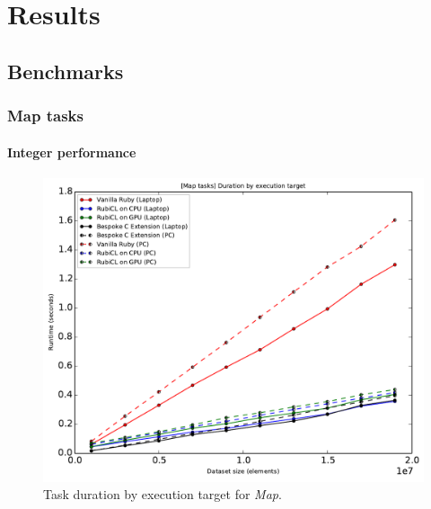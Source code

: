 \chapter{Results}

\section{Benchmarks}
\subsection{Map tasks}
\subsubsection{Integer performance}
\begin{figure}[H]
  \centering
  \includegraphics[width=\textwidth]{./graphing/just_map/runtimes.pdf}
  \caption{Task duration by execution target for \emph{Map}.}
  \label{fig:map_task_runtime_g}

\end{figure}
